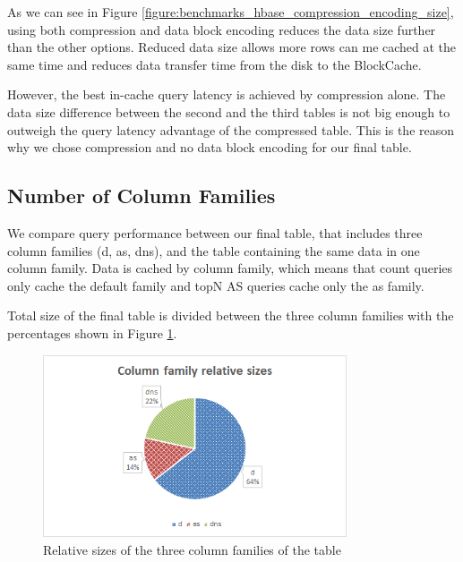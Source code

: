 As we can see in Figure \ref{figure:benchmarks_hbase_compression_encoding_size}, using both compression and data block encoding reduces the data size further than the other options. Reduced data size allows more rows can me cached at the same time and reduces data transfer time from the disk to the BlockCache.

However, the best in-cache query latency is achieved by compression alone. The data size difference between the second and the third tables is not big enough to outweigh the query latency advantage of the compressed table. This is the reason why we chose compression and no data block encoding for our final table.

\subsection{Number of Column Families}

We compare query performance between our final table, that includes three column families (d, as, dns), and the table containing the same data in one column family. Data is cached by column family, which means that count queries only cache the default family and topN AS queries cache only the as family.

Total size of the final table is divided between the three column families with the percentages shown in Figure \ref{figure:benchmarks_hbase_cf_sizes}.

\begin{figure}[H]
\centering
\includegraphics[width=0.8\textwidth]{figures/benchmarks_hbase_cf_sizes}
\caption{Relative sizes of the three column families of the table}
\label{figure:benchmarks_hbase_cf_sizes}
\end{figure}

